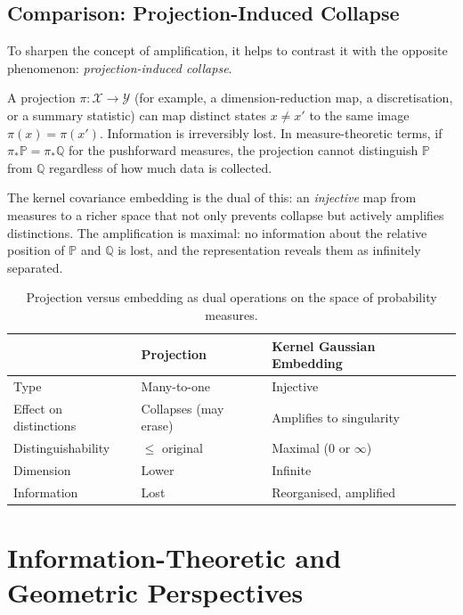 \documentclass[12pt, oneside]{book}
\theoremstyle{plain}
\theoremstyle{definition}
\newcommand{\calX}{\mathcal{X}}
\newcommand{\PP}{\mathbb{P}}
\newcommand{\QQ}{\mathbb{Q}}
\renewcommand{\leq}{\leqslant}
\newcommand{\calY}{\mathcal{Y}}
\begin{document}
\section{Comparison: Projection-Induced Collapse}

To sharpen the concept of amplification, it helps to contrast it with the opposite phenomenon: \emph{projection-induced collapse}.

A projection $\pi: \calX \to \calY$ (for example, a dimension-reduction map, a discretisation, or a summary statistic) can map distinct states $x \neq x'$ to the same image $\pi(x) = \pi(x')$. Information is irreversibly lost. In measure-theoretic terms, if $\pi_* \PP = \pi_* \QQ$ for the pushforward measures, the projection cannot distinguish $\PP$ from $\QQ$ regardless of how much data is collected.

The kernel covariance embedding is the dual of this: an \emph{injective} map from measures to a richer space that not only prevents collapse but actively amplifies distinctions. The amplification is maximal: no information about the relative position of $\PP$ and $\QQ$ is lost, and the representation reveals them as infinitely separated.

\begin{table}[h]
\centering
\begin{tabular}{p{3.8cm} p{4.5cm} p{4.0cm}}
\toprule
& \textbf{Projection} & \textbf{Kernel Gaussian Embedding} \\
\midrule
Type & Many-to-one & Injective \\
Effect on distinctions & Collapses (may erase) & Amplifies to singularity \\
Distinguishability & $\leq$ original & Maximal ($0$ or $\infty$) \\
Dimension & Lower & Infinite \\
Information & Lost & Reorganised, amplified \\
\bottomrule
\end{tabular}
\caption{Projection versus embedding as dual operations on the space of probability measures.}
\end{table}

\chapter{Information-Theoretic and Geometric Perspectives}
\label{chap:information}
\end{document}
